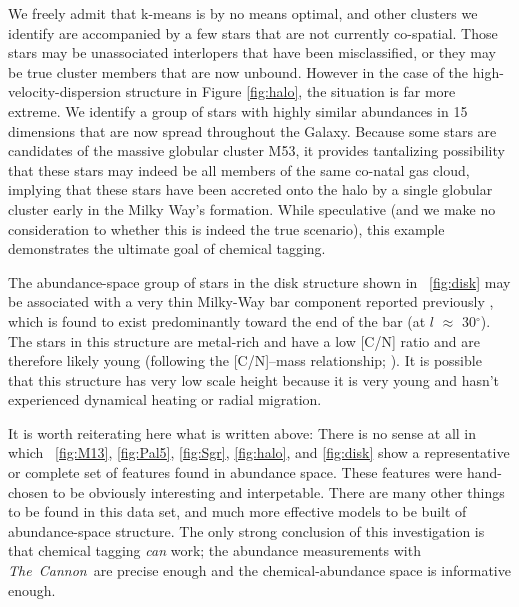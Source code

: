 \documentclass[12pt, letterpaper, preprint]{aastex}
\newcommand{\project}[1]{\textsl{#1}}
\newcommand{\thecannon}{\project{The~Cannon}}
\begin{document}
We freely admit that k-means is by no means optimal, and other clusters
we identify are accompanied by a few stars that are not currently co-spatial.
Those stars may be unassociated interlopers that have been misclassified,
or they may be true cluster members that are now unbound. However in the
case of the high-velocity-dispersion structure in Figure \ref{fig:halo},
the situation is far more extreme. We identify a group of stars with
highly similar abundances in 15 dimensions that are now spread throughout
the Galaxy. Because some stars are candidates of the massive globular
cluster M53, it provides tantalizing possibility that these stars may
indeed be all members of the same co-natal gas cloud, implying that 
these stars have been accreted onto the halo by a single globular
cluster early in the Milky Way's formation. While speculative (and we
make no consideration to whether this is indeed the true scenario),
this example demonstrates the ultimate goal of chemical tagging. 


The abundance-space group of stars in the disk structure shown in
\figurename~\ref{fig:disk} may be associated with a very thin
Milky-Way bar component reported previously \citep{wegg}, which is
found to exist predominantly toward the end of the bar (at $l$
$\approx$ 30$^\circ$).
The stars in this structure are metal-rich and have a low
[C/N] ratio and are therefore likely young (following the [C/N]--mass
relationship; \citealt{martig}).
It is possible that this structure has very low scale height because
it is very young and hasn't experienced dynamical heating or radial
migration.

It is worth reiterating here what is written above:
There is no sense at all in which \figurename~\ref{fig:M13},
\ref{fig:Pal5}, \ref{fig:Sgr}, \ref{fig:halo}, and \ref{fig:disk} show
a representative or complete set of features found in abundance space.
These features were hand-chosen to be obviously interesting and
interpetable.
There are many other things to be found in this data set, and much
more effective models to be built of abundance-space structure.
The only strong conclusion of this investigation is that chemical
tagging \emph{can} work; the abundance measurements with \thecannon\ are
precise enough and the chemical-abundance space is informative enough.
\end{document}
